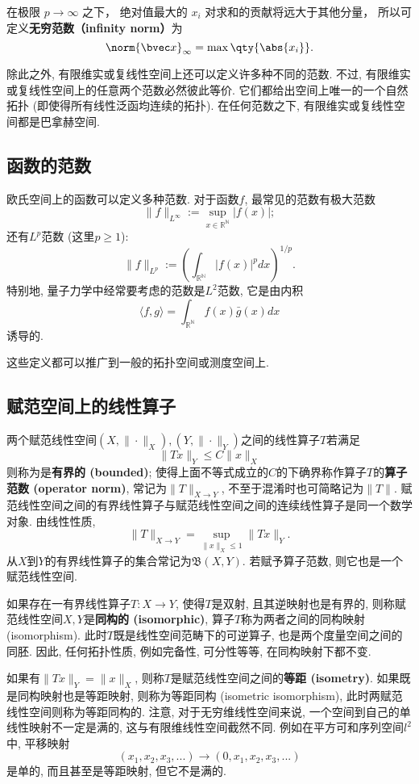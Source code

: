 在极限 $p \to \infty$ 之下， 绝对值最大的 $x_i$ 对求和的贡献将远大于其他分量， 所以可定义\textbf{无穷范数（infinity norm）}为
\begin{equation}
\norm{\bvec x}_\infty = \max \qty{\abs{x_i}}.
\end{equation}

除此之外, 有限维实或复线性空间上还可以定义许多种不同的范数. 不过, 有限维实或复线性空间上的任意两个范数必然彼此等价. 它们都给出空间上唯一的一个自然拓扑 (即使得所有线性泛函均连续的拓扑). 在任何范数之下, 有限维实或复线性空间都是巴拿赫空间.

\subsection{函数的范数}
欧氏空间上的函数可以定义多种范数. 对于函数$f$, 最常见的范数有极大范数
$$
\|f\|_{L^\infty}:=\sup_{x\in\mathbb{R^N}}|f(x)|;
$$
还有$L^p$范数 (这里$p\geq1$):
$$
\|f\|_{L^p}:=\left(\int_{\mathbb{R^N}}|f(x)|^pdx\right)^{1/p}.
$$
特别地, 量子力学中经常要考虑的范数是$L^2$范数, 它是由内积
$$
\langle f,g\rangle=\int_{\mathbb{R^N}}f(x)\bar g(x)dx
$$
诱导的.

这些定义都可以推广到一般的拓扑空间或测度空间上.

\subsection{赋范空间上的线性算子}
两个赋范线性空间$(X,\|\cdot\|_X),(Y,\|\cdot\|_Y)$之间的线性算子$T$若满足
$$
\|Tx\|_Y\leq C\|x\|_X
$$
则称为是\textbf{有界的 (bounded)}; 使得上面不等式成立的$C$的下确界称作算子$T$的\textbf{算子范数 (operator norm)}, 常记为$\|T\|_{X\to Y}$, 不至于混淆时也可简略记为$\|T\|$. 赋范线性空间之间的有界线性算子与赋范线性空间之间的连续线性算子是同一个数学对象. 由线性性质,
$$
\|T\|_{X\to Y}=\sup_{\|x\|_X\leq 1}\|Tx\|_Y.
$$
从$X$到$Y$的有界线性算子的集合常记为$\mathfrak{B}(X,Y)$. 若赋予算子范数, 则它也是一个赋范线性空间.

如果存在一有界线性算子$T:X\to Y$, 使得$T$是双射, 且其逆映射也是有界的, 则称赋范线性空间$X,Y$是\textbf{同构的 (isomorphic)}, 算子$T$称为两者之间的同构映射 (isomorphism). 此时$T$既是线性空间范畴下的可逆算子, 也是两个度量空间之间的同胚. 因此, 任何拓扑性质, 例如完备性, 可分性等等, 在同构映射下都不变. 

如果有$\|Tx\|_Y=\|x\|_X$, 则称$T$是赋范线性空间之间的\textbf{等距 (isometry)}. 如果既是同构映射也是等距映射, 则称为等距同构 (isometric isomorphism), 此时两赋范线性空间则称为等距同构的. 注意, 对于无穷维线性空间来说, 一个空间到自己的单线性映射不一定是满的, 这与有限维线性空间截然不同. 例如在平方可和序列空间$l^2$中, 平移映射
$$
(x_1,x_2,x_3,...)\to(0,x_1,x_2,x_3,...)
$$
是单的, 而且甚至是等距映射, 但它不是满的.

